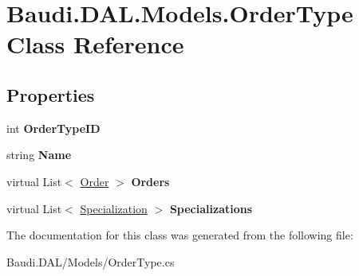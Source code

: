 \hypertarget{class_baudi_1_1_d_a_l_1_1_models_1_1_order_type}{}\section{Baudi.\+D\+A\+L.\+Models.\+Order\+Type Class Reference}
\label{class_baudi_1_1_d_a_l_1_1_models_1_1_order_type}
\subsection*{Properties}
\begin{DoxyCompactItemize}
\item 
\hypertarget{class_baudi_1_1_d_a_l_1_1_models_1_1_order_type_a11434e94a00a096fc81678053c7df710}{}int {\bfseries Order\+Type\+I\+D}\label{class_baudi_1_1_d_a_l_1_1_models_1_1_order_type_a11434e94a00a096fc81678053c7df710}

\item 
\hypertarget{class_baudi_1_1_d_a_l_1_1_models_1_1_order_type_adb2daa02ec0a3c6aa2b6ae3bc1c66626}{}string {\bfseries Name}\label{class_baudi_1_1_d_a_l_1_1_models_1_1_order_type_adb2daa02ec0a3c6aa2b6ae3bc1c66626}

\item 
\hypertarget{class_baudi_1_1_d_a_l_1_1_models_1_1_order_type_aa2e95ecbec1a96e6597fd0860ba9e121}{}virtual List$<$ \hyperlink{class_baudi_1_1_d_a_l_1_1_models_1_1_order}{Order} $>$ {\bfseries Orders}\label{class_baudi_1_1_d_a_l_1_1_models_1_1_order_type_aa2e95ecbec1a96e6597fd0860ba9e121}

\item 
\hypertarget{class_baudi_1_1_d_a_l_1_1_models_1_1_order_type_ac8b1027d99054a31ac96b34caf514b91}{}virtual List$<$ \hyperlink{class_baudi_1_1_d_a_l_1_1_models_1_1_specialization}{Specialization} $>$ {\bfseries Specializations}\label{class_baudi_1_1_d_a_l_1_1_models_1_1_order_type_ac8b1027d99054a31ac96b34caf514b91}

\end{DoxyCompactItemize}


The documentation for this class was generated from the following file\+:\begin{DoxyCompactItemize}
\item 
Baudi.\+D\+A\+L/\+Models/Order\+Type.\+cs\end{DoxyCompactItemize}
